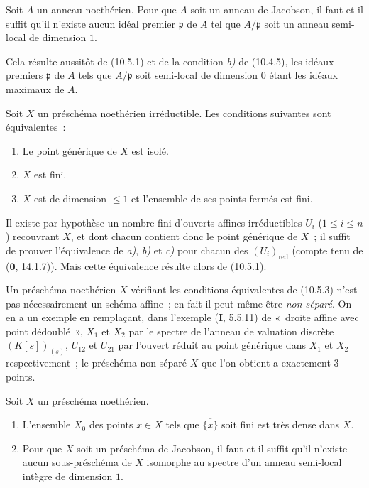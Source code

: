 \begin{corollary}[10.5.2]
\label{IV.10.5.2-fr}
Soit $A$ un anneau noethérien. Pour que $A$ soit un anneau de Jacobson, il faut
et il suffit qu'il n'existe aucun idéal premier $\mathfrak p$ de $A$ tel que
$A/\mathfrak p$ soit un anneau semi-local de dimension $1$.
\end{corollary}

Cela résulte aussitôt de (10.5.1) et de la condition \emph{b)} de (10.4.5),
les idéaux premiers $\mathfrak p$ de $A$ tels que $A/\mathfrak p$ soit
semi-local de dimension $0$ étant les idéaux maximaux de $A$.

\begin{corollary}[10.5.3]
\label{IV.10.5.3-fr}
Soit $X$ un préschéma noethérien irréductible. Les conditions suivantes sont
équivalentes~:
\begin{enumerate}[label=\emph{\alph*)}]
  \item Le point générique de $X$ est isolé.
  \item $X$ est fini.
  \item $X$ est de dimension $\leq1$ et l'ensemble de ses points fermés est
  fini.
\end{enumerate}
\end{corollary}

Il existe par hypothèse un nombre fini d'ouverts affines irréductibles $U_i$
($1\leq i\leq n$) recouvrant $X$, et dont chacun contient donc le point
générique de $X$~; il suffit de prouver l'équivalence de \emph{a)}, \emph{b)}
et \emph{c)} pour chacun des $(U_i)_{\mathrm{red}}$ (compte tenu de
($\mathbf 0$, 14.1.7)). Mais cette équivalence résulte alors de (10.5.1).

\begin{remark}[10.5.4]
\label{IV.10.5.4-fr}
Un préschéma noethérien $X$ vérifiant les conditions équivalentes de (10.5.3)
n'est pas nécessairement un schéma affine~; en fait il peut même être
\emph{non séparé}. On en a un exemple en remplaçant, dans l'exemple
(\textbf{I}, 5.5.11) de «~droite affine avec point dédoublé~», $X_1$ et $X_2$
par le spectre de l'anneau de valuation discrète $(K[s])_{(s)}$, $U_{12}$ et
$U_{21}$ par l'ouvert réduit au point générique dans $X_1$ et $X_2$
respectivement~; le préschéma non séparé $X$ que l'on obtient a exactement
$3$ points.
\end{remark}

\begin{proposition}[10.5.5]
\label{IV.10.5.5-fr}
Soit $X$ un préschéma noethérien.
\begin{enumerate}[label=(\roman*)]
  \item L'ensemble $X_0$ des points $x\in X$ tels que $\overline{\{x\}}$ soit
  fini est très dense dans $X$.
  \item Pour que $X$ soit un préschéma de Jacobson, il faut et il suffit qu'il
  n'existe aucun sous-préschéma de $X$ isomorphe au spectre d'un anneau
  semi-local intègre de dimension $1$.
\end{enumerate}
\end{proposition}

